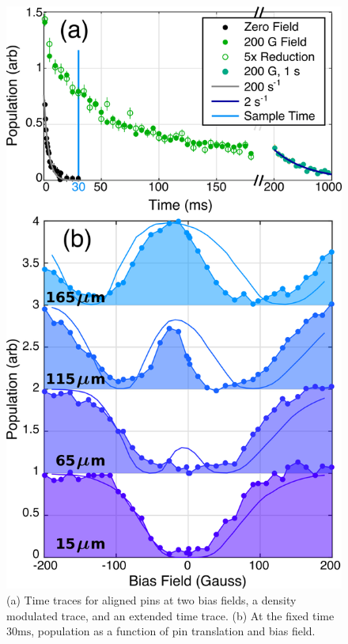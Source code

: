 \documentclass[%
 reprint,
groupedaddress,
 amsmath,amssymb,
 aps,
prl,
]{revtex4-1}
\begin{document}
\begin{figure}[tb]
\includegraphics[width=\linewidth]{VWFig/tim-style-by-dave-1hz-blues.png}%
\caption{
(a) Time traces for aligned pins at two bias fields, a density modulated trace, and an extended time trace. (b) At the fixed time $30 \text{ms}$, population as a function of pin translation and bias field.
\label{fig:WVplot}}
\end{figure}
\end{document}
